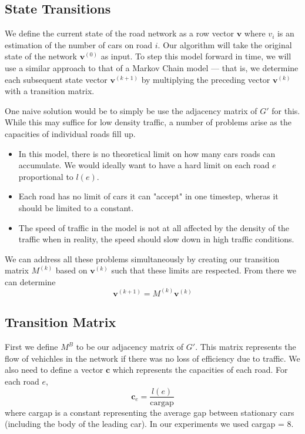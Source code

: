\documentclass[a4paper]{article}
\begin{document}
\subsection{State Transitions}
We define the current state of the road network as a row vector $\mathbf{v}$ where $v_i$ is an estimation of the number of cars on road $i$.
Our algorithm will take the original state of the network $\mathbf{v}^{(0)}$ as input.
To step this model forward in time, we will use a similar approach to that of a Markov Chain model --- 
that is, we determine each subsequent state vector $\mathbf{v}^{(k + 1)}$ by multiplying the
preceding vector $\mathbf{v}^{(k)}$ with a transition matrix.

One naive solution would be to simply be use the adjacency matrix of $G'$ for this.
While this may suffice for low density traffic, a number of problems arise as the capacities of individual roads fill up.
\begin{itemize}
	\item In this model, there is no theoretical limit on how many cars roads can accumulate.
		We would ideally want to have a hard limit on each road $e$ proportional to $l(e)$.
	\item Each road has no limit of cars it can "accept" in one timestep, wheras it should be limited to a constant.
	\item The speed of traffic in the model is not at all affected by the density of the traffic when in reality, the speed should slow down in high traffic conditions.
\end{itemize}

We can address all these problems simultaneously by creating our transition matrix $M^{(k)}$ based on $\mathbf{v}^{(k)}$ such that these limits are respected.
From there we can determine 
$$\mathbf{v}^{(k + 1)} = M^{(k)}\mathbf{v}^{(k)}$$

\subsection{Transition Matrix}
First we define $M^B$ to be our adjacency matrix of $G'$. This matrix represents the flow of vehichles in the network if there was no loss of efficiency due to traffic.
We also need to define a vector $\mathbf{c}$ which represents the capacities of each road. For each road $e$,
$$
\mathbf{c}_e = \frac{l(e)}{\mathrm{cargap}}
$$
where cargap is a constant representing the average gap between stationary cars (including the body of the leading car). In our experiments we used cargap = 8.
\end{document}

